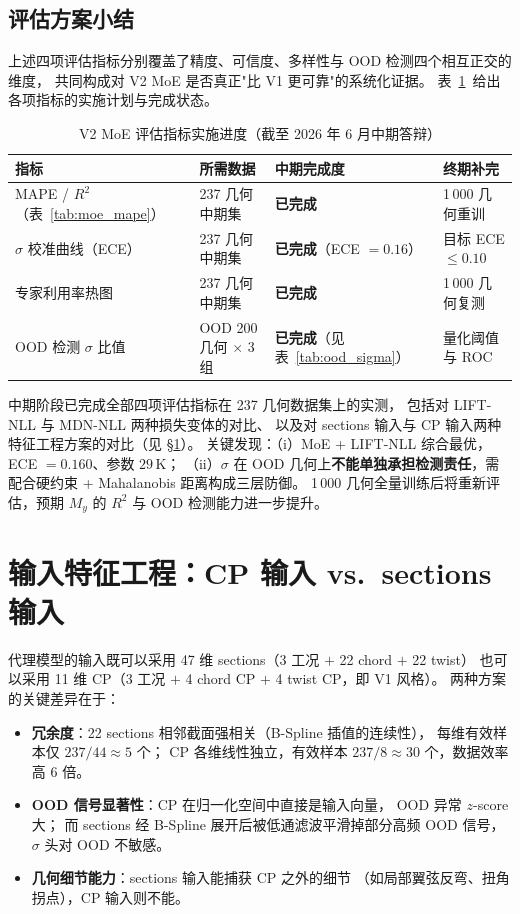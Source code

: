 \subsection{评估方案小结}

上述四项评估指标分别覆盖了精度、可信度、多样性与 OOD 检测四个相互正交的维度，
共同构成对 V2 MoE 是否真正"比 V1 更可靠"的系统化证据。
表~\ref{tab:moe_eval_plan}~给出各项指标的实施计划与完成状态。

\begin{table}[htbp]
\centering
\caption{V2 MoE 评估指标实施进度（截至 2026 年 6 月中期答辩）}
\label{tab:moe_eval_plan}
\begin{tabular}{llll}
\toprule
\textbf{指标} & \textbf{所需数据} & \textbf{中期完成度} & \textbf{终期补完} \\
\midrule
MAPE / $R^2$（表~\ref{tab:moe_mape}） & 237 几何中期集 & \textbf{已完成} & 1\,000 几何重训 \\
$\sigma$ 校准曲线（ECE）  & 237 几何中期集 & \textbf{已完成}（ECE $= 0.16$） & 目标 ECE $\leq 0.10$ \\
专家利用率热图     & 237 几何中期集 & \textbf{已完成} & 1\,000 几何复测 \\
OOD 检测 $\sigma$ 比值 & OOD 200 几何 $\times$ 3 组 & \textbf{已完成}（见表~\ref{tab:ood_sigma}） & 量化阈值与 ROC \\
\bottomrule
\end{tabular}
\end{table}

中期阶段已完成全部四项评估指标在 237 几何数据集上的实测，
包括对 LIFT-NLL 与 MDN-NLL 两种损失变体的对比、
以及对 sections 输入与 CP 输入两种特征工程方案的对比（见 \S\ref{sec:cp_vs_sections}）。
关键发现：（i）MoE + LIFT-NLL 综合最优，ECE $= 0.160$、参数 $29$\,K；
（ii）$\sigma$ 在 OOD 几何上\textbf{不能单独承担检测责任}，需配合硬约束 + Mahalanobis 距离构成三层防御。
1\,000 几何全量训练后将重新评估，预期 $M_y$ 的 $R^2$ 与 OOD 检测能力进一步提升。

\section{输入特征工程：CP 输入 vs.\ sections 输入}
\label{sec:cp_vs_sections}

代理模型的输入既可以采用 47 维 sections（3 工况 $+$ 22 chord $+$ 22 twist）
也可以采用 11 维 CP（3 工况 $+$ 4 chord CP $+$ 4 twist CP，即 V1 风格）。
两种方案的关键差异在于：
\begin{itemize}
  \item \textbf{冗余度}：22 sections 相邻截面强相关（B-Spline 插值的连续性），
        每维有效样本仅 $237 / 44 \approx 5$ 个；
        CP 各维线性独立，有效样本 $237 / 8 \approx 30$ 个，数据效率高 $6$ 倍。
  \item \textbf{OOD 信号显著性}：CP 在归一化空间中直接是输入向量，
        OOD 异常 $z$-score 大；
        而 sections 经 B-Spline 展开后被低通滤波平滑掉部分高频 OOD 信号，
        $\sigma$ 头对 OOD 不敏感。
  \item \textbf{几何细节能力}：sections 输入能捕获 CP 之外的细节
        （如局部翼弦反弯、扭角拐点），CP 输入则不能。
\end{itemize}

